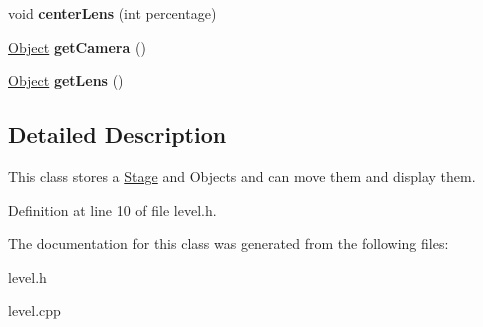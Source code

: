 \begin{DoxyCompactItemize}
\item 
void {\bfseries center\+Lens} (int percentage)\hypertarget{classLevel_ac39dbca241ee739f5f9c2a750c3750f4}{}\label{classLevel_ac39dbca241ee739f5f9c2a750c3750f4}

\item 
\hyperlink{classObject}{Object} {\bfseries get\+Camera} ()\hypertarget{classLevel_a11a17dbe04938950421d001a8f94cbbc}{}\label{classLevel_a11a17dbe04938950421d001a8f94cbbc}

\item 
\hyperlink{classObject}{Object} {\bfseries get\+Lens} ()\hypertarget{classLevel_a33bd74850ef322de8d76572f9fea312f}{}\label{classLevel_a33bd74850ef322de8d76572f9fea312f}

\end{DoxyCompactItemize}


\subsection{Detailed Description}
This class stores a \hyperlink{classStage}{Stage} and Objects and can move them and display them. 

Definition at line 10 of file level.\+h.



The documentation for this class was generated from the following files\+:\begin{DoxyCompactItemize}
\item 
level.\+h\item 
level.\+cpp\end{DoxyCompactItemize}
